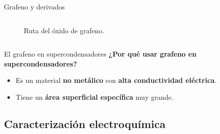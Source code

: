 \documentclass[aspectratio=169]{beamer}
\begin{document}
\begin{frame}{Grafeno y derivados}
\begin{columns}
\begin{column}{0.4\textwidth}
\begin{onlyenv}
\begin{figure}
						\caption{Ruta del óxido de grafeno.}
					\end{figure}
				\end{onlyenv}
			\end{column}
		\end{columns}
	\end{frame}

	\begin{frame}{El grafeno en supercondensadores}
		\only<1->\textbf{¿Por qué usar grafeno en supercondensadores?}
		\begin{itemize}[<+(1)->]
			\item Es un material \textbf{no metálico} con \textbf{alta conductividad eléctrica}.
			\item Tiene un \textbf{área superficial específica} muy grande.
		\end{itemize}
	\end{frame}


	\subsection{Caracterización electroquímica}
	
\end{document}
